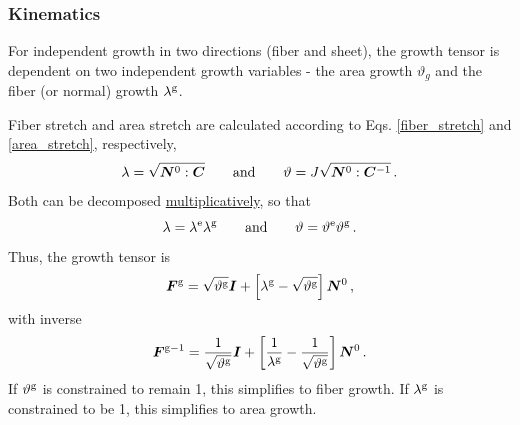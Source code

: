 \documentclass[10pt,letterpaper,oneside]{report}
\newcommand{\ten}[1]{\mbox{\boldmath $#1$}{}}
\newcommand{\scas}[1]{\mbox{{\scriptsize{${\rm{#1}}$}}}{}}
\begin{document}
\begin{itemize}
\subsubsection{Kinematics}
For independent growth in two directions (fiber and sheet), the growth tensor is dependent on two independent growth variables - the area growth $\vartheta_g$ and the fiber (or normal) growth $\lambda^{\scas{g}}$.

Fiber stretch and area stretch are calculated according to Eqs. \ref{fiber_stretch} and \ref{area_stretch}, respectively,
\begin{equation}
\lambda = \sqrt{ \ten{N}^0 : \ten{C} } 
\qquad \mbox{and} \qquad 
\vartheta = J \sqrt{ \ten{N}^0 : \ten{C}^{-1} } \, . 
\end{equation}
Both can be decomposed \hyperlink{multiplicative}{multiplicatively}, so that
\begin{equation}
\lambda = \lambda^{\scas{e}} \lambda^{\scas{g}} \qquad \text{and} \qquad \vartheta = \vartheta^{\scas{e}} \vartheta^{\scas{g}} \, . 
\end{equation}
Thus, the growth tensor is
\begin{equation}
\ten{F}^{\scas{g}} = \sqrt{\vartheta^{\scas{g}}} \ten{I} + \left[ \lambda^{\scas{g}} - \sqrt{\vartheta^{\scas{g}}} \right] \ten{N}^0 \, , 
\end{equation} 
with inverse
\begin{equation}
\ten{F}^{\scas{g}-1} = \frac{1}{\sqrt{\vartheta^{\scas{g}}}} \ten{I} + \left[ \frac{1}{\lambda^{\scas{g}}} - \frac{1}{\sqrt{\vartheta^{\scas{g}}}} \right] \ten{N}^0 \, . 
\end{equation}
If $\vartheta^{\scas{g}}$ is constrained to remain 1, this simplifies to fiber growth.  If $\lambda^{\scas{g}}$ is constrained to be 1, this simplifies to area growth.  


\end{itemize}
\end{document}
